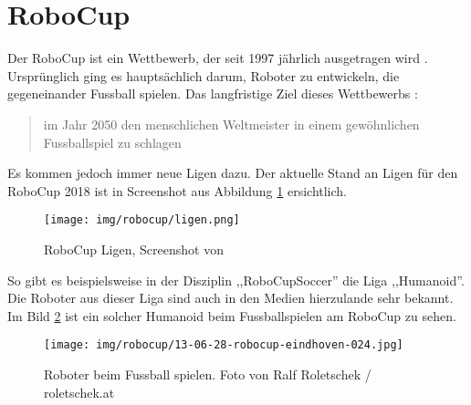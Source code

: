 \section{RoboCup}
Der RoboCup ist ein Wettbewerb, der seit 1997 jährlich ausgetragen wird \cite{wikipedia-robocup}. Ursprünglich ging es hauptsächlich darum, Roboter zu entwickeln, die gegeneinander Fussball spielen. Das langfristige Ziel dieses Wettbewerbs \cite{wikipedia-roboterfussball}: 
\begin{quote}
	im Jahr 2050 den menschlichen Weltmeister in einem gewöhnlichen Fussballspiel zu schlagen
\end{quote}
Es kommen jedoch immer neue Ligen dazu. Der aktuelle Stand an Ligen für den RoboCup 2018 ist in Screenshot aus Abbildung \ref{fig:robocup_ligen} ersichtlich.
\begin{figure}[H]
	\centering
	\texttt{[image: img/robocup/ligen.png]}
	\caption{RoboCup Ligen, Screenshot von \cite{www.robocup.org}}
	\label{fig:robocup_ligen}
\end{figure} 
So gibt es beispielsweise in der Disziplin ,,RoboCupSoccer'' die Liga ,,Humanoid''. Die Roboter aus dieser Liga sind auch in den Medien hierzulande sehr bekannt. Im Bild \ref{fig:robocup_fussball} ist ein solcher Humanoid beim Fussballspielen am RoboCup zu sehen.
\begin{figure}[H]
	\centering
	\texttt{[image: img/robocup/13-06-28-robocup-eindhoven-024.jpg]}
	\caption{Roboter beim Fussball spielen. Foto von Ralf Roletschek / roletschek.at \cite{robocup2013}}
	\label{fig:robocup_fussball}
\end{figure}
